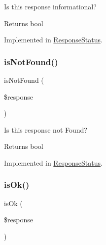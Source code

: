 Is this response informational?

\begin{DoxyReturn}{Returns}
bool 
\end{DoxyReturn}


Implemented in \mbox{\hyperlink{class_pes_1_1_http_1_1_response_status_aefe91e716fcd58aed7eea5eade4b7cc0}{Response\+Status}}.

\mbox{\label{interface_pes_1_1_http_1_1_response_status_interface_aef4db1f3ebf7e7ddcf51de3af3471713}} 
\subsubsection{\texorpdfstring{is\+Not\+Found()}{isNotFound()}}
{\footnotesize\ttfamily is\+Not\+Found (\begin{DoxyParamCaption}\item[{Response\+Interface}]{\$response }\end{DoxyParamCaption})}

Is this response not Found?

\begin{DoxyReturn}{Returns}
bool 
\end{DoxyReturn}


Implemented in \mbox{\hyperlink{class_pes_1_1_http_1_1_response_status_aef4db1f3ebf7e7ddcf51de3af3471713}{Response\+Status}}.

\mbox{\label{interface_pes_1_1_http_1_1_response_status_interface_ab3105c65ed8a2617a4928f250dba979f}} 
\subsubsection{\texorpdfstring{is\+Ok()}{isOk()}}
{\footnotesize\ttfamily is\+Ok (\begin{DoxyParamCaption}\item[{Response\+Interface}]{\$response }\end{DoxyParamCaption})}

